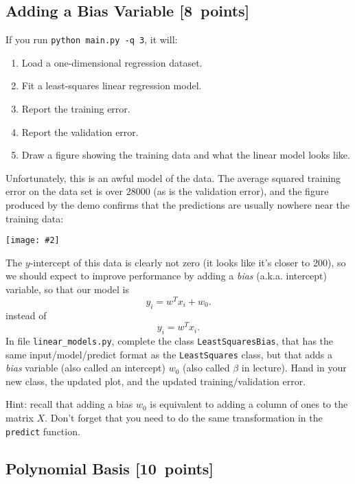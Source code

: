 \documentclass{article}
\newcommand{\blu}[1]{{\textcolor{blu}{#1}}}
\let\ask\blu
\newcommand\pts[1]{\textcolor{pointscolour}{[#1~points]}}
\newcommand{\centerfig}[2]{\begin{center}\texttt{[image: \#2]}\end{center}}
\begin{document}
\subsection{Adding a Bias Variable \pts{8}}

\label{biasvar}
If you run  \verb|python main.py -q 3|, it will:
\begin{enumerate}
\item Load a one-dimensional regression dataset.
\item Fit a least-squares linear regression model.
\item Report the training error.
\item Report the validation error.
\item Draw a figure showing the training data and what the linear model looks like.
\end{enumerate}
Unfortunately, this is an awful model of the data. The average squared training error on the data set is over 28000
(as is the validation error), and the figure produced by the demo confirms that the predictions are usually nowhere near
 the training data:
\centerfig{.5}{./figs/least_squares_no_bias.pdf}
The $y$-intercept of this data is clearly not zero (it looks like it's closer to $200$),
so we should expect to improve performance by adding a \emph{bias} (a.k.a. intercept) variable, so that our model is
\[
y_i = w^Tx_i + w_0.
\]
instead of
\[
y_i = w^Tx_i.
\]
\ask{In file \texttt{linear\string_models.py}, complete the class \texttt{LeastSquaresBias},
that has the same input/model/predict format as the \texttt{LeastSquares} class,
but that adds a \emph{bias} variable (also called an intercept) $w_0$ (also called $\beta$ in lecture). Hand in your new class, the updated plot,
and the updated training/validation error.}

Hint: recall that adding a bias $w_0$ is equivalent to adding a column of ones to the matrix $X$. Don't forget that you need to do the same transformation in the \texttt{predict} function.

%

\subsection{Polynomial Basis \pts{10}}
\end{document}
